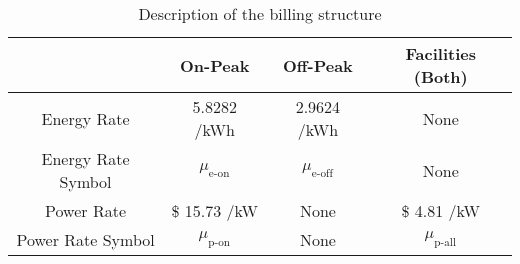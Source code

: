 \begin{table*}
\centering
\caption{Description of the billing structure}
\begin{tabular}{c | c c c}
		                   & On-Peak                & Off-Peak               & Facilities (Both)\\ \hline
		Energy Rate        & 5.8282 \textcent  /kWh & 2.9624 \textcent /kWh  & None \\
		Energy Rate Symbol & $\mu_{\text{e-on}}$    & $\mu_{\text{e-off}}$   & None \\
		Power Rate  & \$ 15.73 /kW           & None                   & \$ 4.81 /kW \\
		Power Rate Symbol  & $\mu_{\text{p-on}}$    & None            & $\mu_{\text{p-all}}$
	\end{tabular}
	\label{tab:charges} 
\end{table*}

